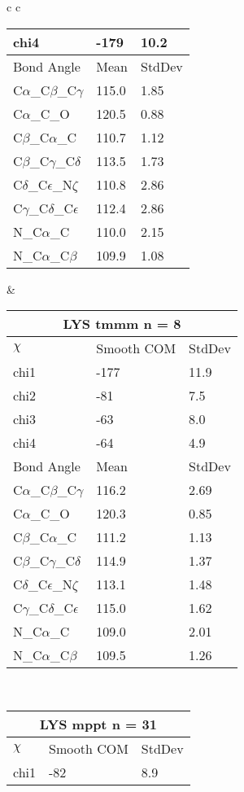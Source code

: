 \begin{longtable}{ c c }
\begin{tabular}{ l l l }
  chi4 & -179 & 10.2 \\ \midrule
  Bond Angle   & Mean     & StdDev \\ \midrule
  C$\alpha$\_C$\beta$\_C$\gamma$ & 115.0 & 1.85\\
  C$\alpha$\_C\_O & 120.5 & 0.88\\
  C$\beta$\_C$\alpha$\_C & 110.7 & 1.12\\
  C$\beta$\_C$\gamma$\_C$\delta$ & 113.5 & 1.73\\
  C$\delta$\_C$\epsilon$\_N$\zeta$ & 110.8 & 2.86\\
  C$\gamma$\_C$\delta$\_C$\epsilon$ & 112.4 & 2.86\\
  N\_C$\alpha$\_C & 110.0 & 2.15\\
  N\_C$\alpha$\_C$\beta$ & 109.9 & 1.08\\
  \bottomrule
  \end{tabular}
  &
  \begin{tabular}{ l l l }
  \toprule
  \multicolumn{3}{c}{LYS \textbf{tmmm} n = 8} \\ \toprule
  $\chi$       & Smooth COM & StdDev \\ \midrule
  chi1 & -177 & 11.9 \\ 
  chi2 & -81 & 7.5 \\ 
  chi3 & -63 & 8.0 \\ 
  chi4 & -64 & 4.9 \\ \midrule
  Bond Angle   & Mean     & StdDev \\ \midrule
  C$\alpha$\_C$\beta$\_C$\gamma$ & 116.2 & 2.69\\
  C$\alpha$\_C\_O & 120.3 & 0.85\\
  C$\beta$\_C$\alpha$\_C & 111.2 & 1.13\\
  C$\beta$\_C$\gamma$\_C$\delta$ & 114.9 & 1.37\\
  C$\delta$\_C$\epsilon$\_N$\zeta$ & 113.1 & 1.48\\
  C$\gamma$\_C$\delta$\_C$\epsilon$ & 115.0 & 1.62\\
  N\_C$\alpha$\_C & 109.0 & 2.01\\
  N\_C$\alpha$\_C$\beta$ & 109.5 & 1.26\\
  \bottomrule
  \end{tabular}
  \\
  \begin{tabular}{ l l l }
  \toprule
  \multicolumn{3}{c}{LYS \textbf{mppt} n = 31} \\ \toprule
  $\chi$       & Smooth COM & StdDev \\ \midrule
  chi1 & -82 & 8.9 \\ 

\end{tabular}
\end{longtable}
